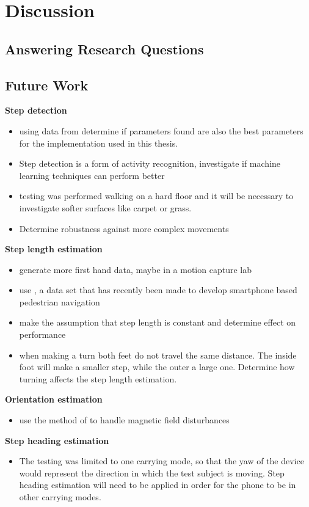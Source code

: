 \chapter{Discussion}

\section{Answering Research Questions}

\section{Future Work}
\textbf{Step detection}
\begin{itemize}
	\item using data from \cite{Salvi2018} determine if parameters found are also the best parameters for the implementation used in this thesis.
	\item Step detection is a form of activity recognition, investigate if machine learning techniques can perform better  
	\item testing was performed walking on a hard floor and it will be necessary to investigate softer surfaces like carpet or grass.
	\item Determine robustness against more complex movements
\end{itemize}

\textbf{Step length estimation}
\begin{itemize}
	\item generate more first hand data, maybe in a motion capture lab  
	\item use \cite{Bayev2019}, a data set that has recently been made to develop smartphone based pedestrian navigation 
	\item make the assumption that step length is constant and determine effect on performance
	\item when making a turn both feet do not travel the same distance. The inside foot will make a smaller step, while the outer a large one. Determine how turning affects the step length estimation.
\end{itemize}

\textbf{Orientation estimation}
\begin{itemize}
	\item use the method of \cite{Michel2018} to handle magnetic field disturbances
\end{itemize}

\textbf{Step heading estimation}
\begin{itemize}
	\item The testing was limited to one carrying mode, so that the yaw of the device would represent the direction in which the test subject is moving. Step heading estimation will need to be applied in order for the phone to be in other carrying modes.
\end{itemize}

